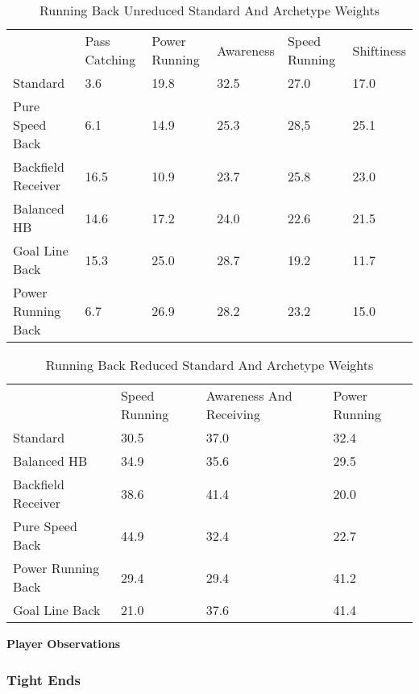 \documentclass[11pt]{article}
\begin{document}
\begin{table}[]
\centering
\caption{Running Back Unreduced Standard And Archetype Weights}
\label{RunningBackUnreducedWeights}
\begin{tabular}{llllll}
                   & Pass Catching & Power Running & Awareness & Speed Running & Shiftiness \\
Standard           & 3.6           & 19.8          & 32.5      & 27.0          & 17.0       \\
Pure Speed Back    & 6.1           & 14.9          & 25.3      & 28,5          & 25.1       \\
Backfield Receiver & 16.5          & 10.9          & 23.7      & 25.8          & 23.0       \\
Balanced HB        & 14.6          & 17.2          & 24.0      & 22.6          & 21.5       \\
Goal Line Back     & 15.3          & 25.0          & 28.7      & 19.2          & 11.7       \\
Power Running Back & 6.7           & 26.9          & 28.2      & 23.2          & 15.0      
\end{tabular}
\end{table}

\begin{table}[]
\centering
\caption{Running Back Reduced Standard And Archetype Weights}
\label{RunningBackReducedWeights}
\begin{tabular}{llll}
                   & Speed Running & Awareness And Receiving & Power Running \\
Standard           & 30.5          & 37.0                    & 32.4          \\
Balanced HB        & 34.9          & 35.6                    & 29.5          \\
Backfield Receiver & 38.6          & 41.4                    & 20.0          \\
Pure Speed Back    & 44.9          & 32.4                    & 22.7          \\
Power Running Back & 29.4          & 29.4                    & 41.2          \\
Goal Line Back     & 21.0          & 37.6                    & 41.4         
\end{tabular}
\end{table}

\textbf{Player Observations}

\subsubsection{Tight Ends}
\end{document}
